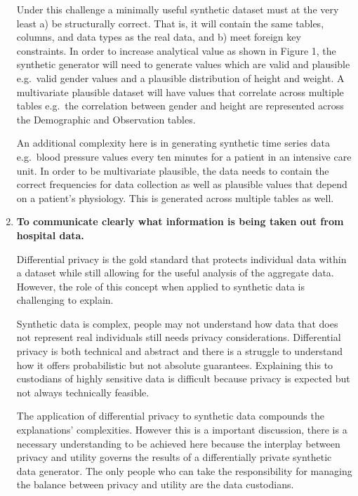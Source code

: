 \documentclass[11pt]{article}
\begin{document}
\begin{enumerate}[leftmargin=*]
    Under this challenge a minimally useful synthetic dataset must at the very least a) be structurally correct. That is, it will contain the same tables, columns, and data types as the real data, and b) meet foreign key constraints. In order to increase analytical value as shown in Figure 1, the synthetic generator will need to generate values which are valid and plausible e.g.\ valid gender values and a plausible distribution of height and weight.  A multivariate plausible dataset will have values that correlate across multiple tables e.g.\ the correlation between gender and height are represented across the Demographic and Observation tables. 
    
    An additional complexity here is in generating synthetic time series data e.g.\ blood pressure values every ten minutes for a patient in an intensive care unit. In order to be multivariate plausible, the data needs to contain the correct frequencies for data collection as well as plausible values that depend on a patient's physiology. This is generated across multiple tables as well.  

    \item \textbf{To communicate clearly what information is being taken out from hospital data.
    }

    
    
    Differential privacy is the gold standard that protects individual data within a dataset while still allowing for the useful analysis of the aggregate data. However, the role of this concept when applied to synthetic data is challenging to explain. 
    
    Synthetic data is complex, people may not understand how data that does not represent real individuals still needs privacy considerations. Differential privacy is both technical and abstract and there is a struggle to understand how it offers probabilistic but not absolute guarantees. Explaining this to custodians of highly sensitive data is difficult because privacy is expected but not always technically feasible.

    
    The application of differential privacy to synthetic data compounds the explanations' complexities. However this is a important discussion, there is a necessary understanding to be achieved here because the interplay between privacy and utility governs the results of a differentially private synthetic data generator. The only people who can take the responsibility for managing the balance between privacy and utility are the data custodians.
\end{enumerate}
\end{document}
